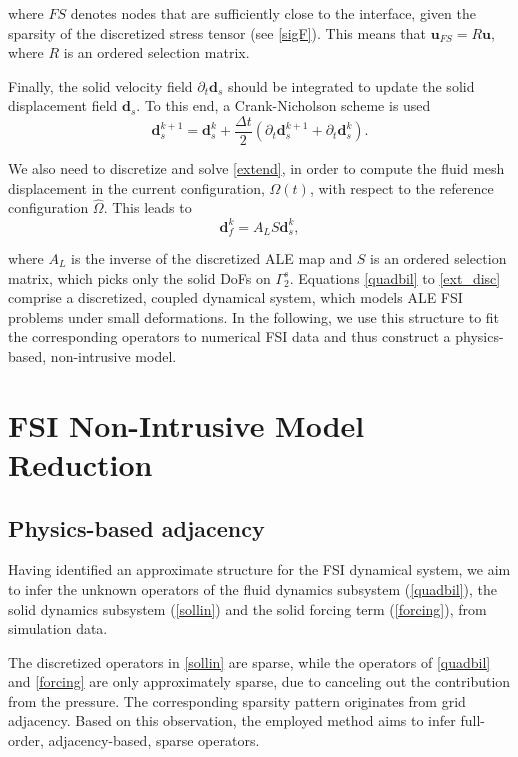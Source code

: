 \documentclass[%
  onecolumn
]{mpi2015-cscpreprint}
\begin{document}
\noindent where $FS$ denotes nodes that are sufficiently close to the interface, given the sparsity of the discretized stress tensor (see \cref{sigF}). This means that $\mathbf{u}_{FS}=R \mathbf{u}$, where $R$ is an ordered selection matrix.

\noindent Finally, the solid velocity field $\partial_{t} \mathbf{d}_s$ should be integrated to update the solid displacement field $ \mathbf{d}_s$. To this end, a Crank-Nicholson scheme is used
\begin{equation}
\label{crnic}
    \mathbf{d}_s^{k+1}=\mathbf{d}_s^{k}+\frac{\Delta t}{2}(\partial_t \mathbf{d}_s^{k+1}+\partial_t \mathbf{d}_s^{k}).
\end{equation}

\noindent We also need to discretize and solve \cref{extend}, in order to compute the fluid mesh displacement in the current configuration, $\Omega(t)$, with respect to the reference configuration $\hat{\Omega}$. This leads to 
\begin{equation}
\label{ext_disc}
\mathbf{d}_f^{k}=A_L S \mathbf{d}_{s}^{k},
\end{equation}

\noindent where $A_L$ is the inverse of the discretized ALE map and $S$ is an ordered selection matrix, which picks only the solid DoFs on $\Gamma_2^s$.
\noindent Equations \eqref{quadbil} to \eqref{ext_disc} comprise a discretized, coupled dynamical system, which models ALE FSI problems under small deformations. In the following, we use this structure to fit the corresponding operators to numerical FSI data and thus construct a physics-based, non-intrusive model.

\section{FSI Non-Intrusive Model Reduction}
\label{sec:ROM}
\subsection{Physics-based adjacency}
\label{subs:pba}

Having identified an approximate structure for the FSI dynamical system, we aim to infer the unknown operators of the fluid dynamics subsystem (\cref{quadbil}), the solid dynamics subsystem (\cref{sollin}) and the solid forcing term (\cref{forcing}), from simulation data. 

The discretized operators in \cref{sollin} are sparse, while the operators of \cref{quadbil} and \cref{forcing} are only approximately sparse, due to canceling out the contribution from the pressure. The corresponding sparsity pattern originates from grid adjacency. Based on this observation, the employed method aims to infer full-order, adjacency-based, sparse operators.
\end{document}

